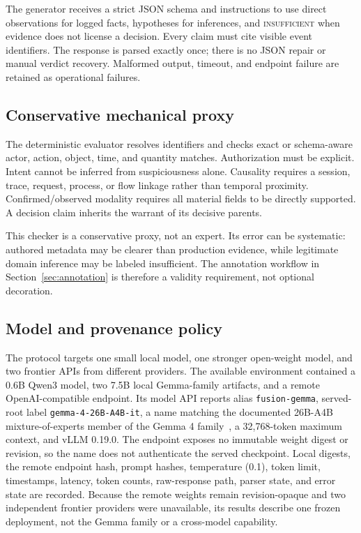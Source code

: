 \documentclass[letterpaper,twocolumn,10pt]{article}
\begin{document}
The generator receives a strict JSON schema and instructions to use direct
observations for logged facts, hypotheses for inferences, and
\textsc{insufficient} when evidence does not license a decision.  Every claim
must cite visible event identifiers.  The response is parsed exactly once;
there is no JSON repair or manual verdict recovery.  Malformed output, timeout,
and endpoint failure are retained as operational failures.

\subsection{Conservative mechanical proxy}

The deterministic evaluator resolves identifiers and checks exact or
schema-aware actor, action, object, time, and quantity matches.  Authorization
must be explicit.  Intent cannot be inferred from suspiciousness alone.
Causality requires a session, trace, request, process, or flow linkage rather
than temporal proximity.  Confirmed/observed modality requires all material
fields to be directly supported.  A decision claim inherits the warrant of its
decisive parents.

This checker is a conservative proxy, not an expert.  Its error can be
systematic: authored metadata may be clearer than production evidence, while
legitimate domain inference may be labeled insufficient.  The annotation
workflow in Section~\ref{sec:annotation} is therefore a validity requirement,
not optional decoration.

\subsection{Model and provenance policy}

The protocol targets one small local model, one stronger open-weight model,
and two frontier APIs from different providers.  The available environment
contained a 0.6B Qwen3 model, two 7.5B local Gemma-family artifacts, and a
remote OpenAI-compatible endpoint.  Its model API reports alias
\texttt{fusion-gemma}, served-root label \texttt{gemma-4-26B-A4B-it}, a
name matching the documented 26B-A4B mixture-of-experts member of the Gemma 4
family~\cite{gemmateam2026gemma4}, a 32,768-token maximum context, and vLLM
0.19.0.  The endpoint exposes no immutable weight digest or revision, so the
name does not authenticate the served checkpoint.  Local digests, the remote
endpoint hash, prompt hashes,
temperature (0.1), token limit, timestamps, latency, token counts, raw-response
path, parser state, and error state are recorded.  Because the remote weights
remain revision-opaque and two independent frontier providers were unavailable,
its results describe one frozen deployment, not the Gemma family or a
cross-model capability.
\end{document}

